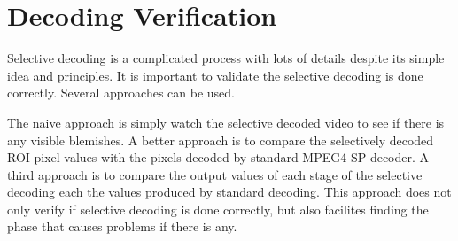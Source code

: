 \section{Decoding Verification}
Selective decoding is a complicated process with lots of details despite its simple idea and principles. It is important to validate the selective decoding is done correctly. Several approaches can be used. 

The naive approach is simply watch the selective decoded video to see if there is any visible blemishes. A better approach is to compare the selectively decoded ROI pixel values with the pixels decoded by standard MPEG4 SP decoder. A third approach is to compare the output values of each stage of the selective decoding each the values produced by standard decoding. This approach does not only verify if selective decoding is done correctly, but also facilites finding the phase that causes problems if there is any. 



